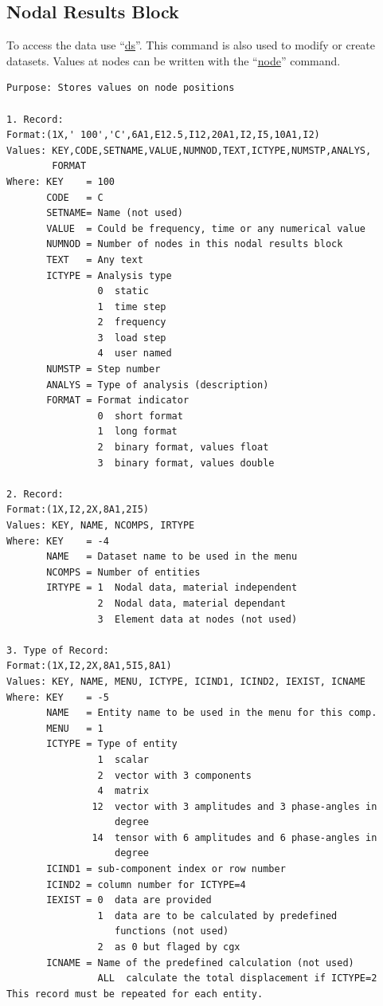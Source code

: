 \documentclass{article}
\providecommand{\htmlref}[2]{\hyperref[#2]{#1}}
\begin{document}
\subsection{\label{Nodal Results Block}Nodal Results Block}
To access the data use ``\htmlref{ds}{ds}''. This command is also used to modify or create datasets. Values at nodes can be written with the ``\htmlref{node}{node}'' command.
\begin{verbatim}
Purpose: Stores values on node positions

1. Record:
Format:(1X,' 100','C',6A1,E12.5,I12,20A1,I2,I5,10A1,I2)
Values: KEY,CODE,SETNAME,VALUE,NUMNOD,TEXT,ICTYPE,NUMSTP,ANALYS,
        FORMAT
Where: KEY    = 100
       CODE   = C
       SETNAME= Name (not used)
       VALUE  = Could be frequency, time or any numerical value
       NUMNOD = Number of nodes in this nodal results block
       TEXT   = Any text
       ICTYPE = Analysis type
                0  static
                1  time step
                2  frequency
                3  load step
                4  user named
       NUMSTP = Step number
       ANALYS = Type of analysis (description)
       FORMAT = Format indicator
                0  short format
                1  long format 
                2  binary format, values float 
                3  binary format, values double 

2. Record:
Format:(1X,I2,2X,8A1,2I5)
Values: KEY, NAME, NCOMPS, IRTYPE
Where: KEY    = -4
       NAME   = Dataset name to be used in the menu
       NCOMPS = Number of entities
       IRTYPE = 1  Nodal data, material independent
                2  Nodal data, material dependant
                3  Element data at nodes (not used) 

3. Type of Record:
Format:(1X,I2,2X,8A1,5I5,8A1) 
Values: KEY, NAME, MENU, ICTYPE, ICIND1, ICIND2, IEXIST, ICNAME
Where: KEY    = -5
       NAME   = Entity name to be used in the menu for this comp.
       MENU   = 1
       ICTYPE = Type of entity
                1  scalar
                2  vector with 3 components
                4  matrix
               12  vector with 3 amplitudes and 3 phase-angles in
                   degree
               14  tensor with 6 amplitudes and 6 phase-angles in
                   degree
       ICIND1 = sub-component index or row number
       ICIND2 = column number for ICTYPE=4
       IEXIST = 0  data are provided
                1  data are to be calculated by predefined
                   functions (not used)
                2  as 0 but flaged by cgx
       ICNAME = Name of the predefined calculation (not used)
                ALL  calculate the total displacement if ICTYPE=2
This record must be repeated for each entity.


\end{verbatim}
\end{document}
